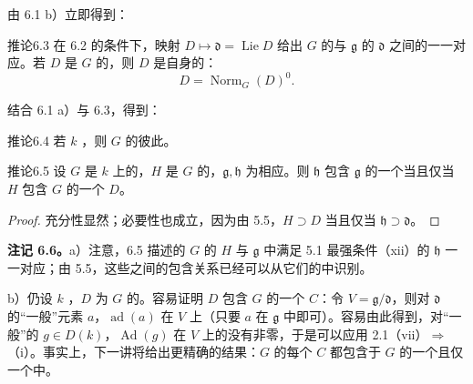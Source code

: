 由 6.1 b）立即得到：
\begin{SGAresult}{推论}{6.3}
在 6.2 的条件下，映射 $D\mapsto\mathfrak d=\operatorname{Lie}D$ 给出 $G$ 的与 $\mathfrak g$ 的 $\mathfrak d$ 之间的一一对应。若 $D$ 是 $G$ 的，则 $D$ 是自身的：
\[D=\operatorname{Norm}_G(D)^0.\]
\end{SGAresult}
结合 6.1 a）与 6.3，得到：
\begin{SGAresult}{推论}{6.4}
若 $k$ ，则 $G$ 的彼此。
\end{SGAresult}
\begin{SGAresult}{推论}{6.5}
设 $G$ 是 $k$ 上的，$H$ 是 $G$ 的，$\mathfrak g,\mathfrak h$ 为相应。则 $\mathfrak h$ 包含 $\mathfrak g$ 的一个当且仅当 $H$ 包含 $G$ 的一个 $D$。
\end{SGAresult}
\begin{proof}
充分性显然；必要性也成立，因为由 5.5，$H\supset D$ 当且仅当 $\mathfrak h\supset\mathfrak d$。
\end{proof}
\textbf{注记 6.6。}a）注意，6.5 描述的 $G$ 的 $H$ 与 $\mathfrak g$ 中满足 5.1 最强条件（xii）的 $\mathfrak h$ 一一对应；由 5.5，这些之间的包含关系已经可以从它们的中识别。

 b）仍设 $k$ ，$D$ 为 $G$ 的。容易证明 $D$ 包含 $G$ 的一个 $C$：令 $V=\mathfrak g/\mathfrak d$，则对 $\mathfrak d$ 的“一般”元素 $a$，$\operatorname{ad}(a)$ 在 $V$ 上（只要 $a$ 在 $\mathfrak g$ 中即可）。容易由此得到，对“一般”的 $g\in D(k)$，$\operatorname{Ad}(g)$ 在 $V$ 上的没有非零，于是可以应用 2.1（vii）$\Rightarrow$（i）。事实上，下一讲将给出更精确的结果：$G$ 的每个 $C$ 都包含于 $G$ 的一个且仅一个中。

